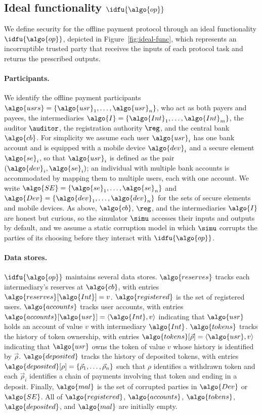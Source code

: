 \subsection{Ideal functionality $\idfu{\algo{op}}$}\label{sec:ideal-func}

We define security for the offline payment protocol through an ideal
functionality $\idfu{\algo{op}}$, depicted in Figure~\ref{fig:ideal-func}, which
represents an incorruptible trusted party that receives the inputs of each
protocol task and returns the prescribed outputs.

\paragraph{Participants.} We identify the offline payment participants
$\algo{usrs} = \{\algo{usr}_1, \ldots, \algo{usr}_n\}$, who act as both payers
and payees, the intermediaries $\algo{I} = \{\algo{Int}_1, \ldots,
\algo{Int}_m\}$, the auditor $\auditor$, the registration authority $\reg$, and
the central bank $\algo{cb}$. For simplicity we assume each user $\algo{usr}_i$
has one bank account and is equipped with a mobile device $\algo{dev}_i$ and a
secure element $\algo{se}_i$, so that $\algo{usr}_i$ is defined as the pair
$(\algo{dev}_i, \algo{se}_i)$; an individual with multiple bank accounts is
accommodated by mapping them to multiple users, each with one account. We write
$\algo{SE} = \{\algo{se}_1, \ldots, \algo{se}_n\}$ and $\algo{Dev} =
\{\algo{dev}_1, \ldots, \algo{dev}_n\}$ for the sets of secure elements and
mobile devices. As above, $\algo{cb}$, $\reg$, and the intermediaries
$\algo{I}$ are honest but curious, so the simulator $\simu$ accesses their
inputs and outputs by default, and we assume a static corruption model in which
$\simu$ corrupts the parties of its choosing before they interact with
$\idfu{\algo{op}}$.

\paragraph{Data stores.} $\idfu{\algo{op}}$ maintains several data stores.
$\algo{reserves}$ tracks each intermediary's reserves at $\algo{cb}$, with
entries $\algo{reserves}[\algo{Int}] = v$. $\algo{registered}$ is the set of
registered users. $\algo{accounts}$ tracks user accounts, with entries
$\algo{accounts}[\algo{usr}] = \langle \algo{Int}, v \rangle$ indicating that
$\algo{usr}$ holds an account of value $v$ with intermediary $\algo{Int}$.
$\algo{tokens}$ tracks the history of token ownership, with entries
$\algo{tokens}[\vec{\rho}] = \langle \algo{usr}, v \rangle$ indicating that
$\algo{usr}$ owns the token of value $v$ whose history is identified by
$\vec{\rho}$.  $\algo{deposited}$ tracks the history of deposited tokens, with
entries $\algo{deposited}[\rho] = \{\vec{\rho}_1, \ldots, \vec{\rho}_n\}$ such
that $\rho$ identifies a withdrawn token and each $\vec{\rho}_i$ identifies a
chain of payments involving that token and ending in a deposit. Finally,
$\algo{mal}$ is the set of corrupted parties in $\algo{Dev}$ or $\algo{SE}$.
All of $\algo{registered}$, $\algo{accounts}$, $\algo{tokens}$,
$\algo{deposited}$, and $\algo{mal}$ are initially empty.

